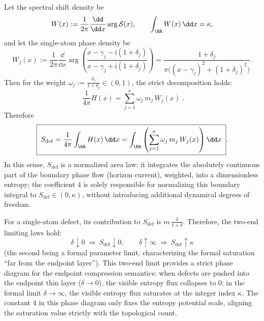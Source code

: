 \begin{proposition}\label{con:xi-sdef-as-weighted-spectral-shift-area}
Let the spectral shift density be
\[
W(x):=\frac{1}{2\pi}\frac{\dd}{\dd x}\arg \mathcal{S}(x),
\qquad \int_{\RR}W(x)\,\dd x=\kappa,
\]
and let the single-atom phase density be
\[
W_j(x):=\frac{1}{2\pi}\frac{\dd}{\dd x}\arg\!\left(\frac{x-\gamma_j-\mathrm{i}(1+\delta_j)}{x-\gamma_j+\mathrm{i}(1+\delta_j)}\right)
=\frac{1+\delta_j}{\pi\bigl((x-\gamma_j)^2+(1+\delta_j)^2\bigr)}.
\]
Then for the weight \(\omega_j:=\frac{\delta_j}{1+\delta_j}\in(0,1)\), the strict decomposition holds:
\[
\boxed{\;
\frac{1}{4\pi}H(x)=\sum_{j=1}^{\kappa}\omega_j\,m_j\,W_j(x)\; }.
\]
Therefore
\[
\boxed{\;
S_{\mathrm{def}}
=\frac{1}{4\pi}\int_{\RR}H(x)\,\dd x
=\int_{\RR}\left(\sum_{j=1}^{\kappa}\omega_j\,m_j\,W_j(x)\right)\dd x\; }.
\]
In this sense, \(S_{\mathrm{def}}\) is a normalized area law: it integrates the absolutely continuous part of the boundary phase flow (horizon current), weighted, into a dimensionless entropy; the coefficient \(4\) is solely responsible for normalizing this boundary integral to \(S_{\mathrm{def}}\in(0,\kappa)\), without introducing additional dynamical degrees of freedom.
\end{proposition}

\begin{proposition}\label{con:xi-sdef-collapse-saturation-phase}
For a single-atom defect, its contribution to \(S_{\mathrm{def}}\) is \(m\,\frac{\delta}{1+\delta}\).
Therefore, the two-end limiting laws hold:
\[
\boxed{\;
\delta\downarrow 0\ \Longrightarrow\ S_{\mathrm{def}}\downarrow 0,
\qquad
\delta\uparrow\infty\ \Longrightarrow\ S_{\mathrm{def}}\uparrow \kappa\;}
\]
(the second being a formal parameter limit, characterizing the formal saturation ``far from the endpoint layer'').
This two-end limit provides a strict phase diagram for the endpoint compression semantics: when defects are pushed into the endpoint thin layer (\(\delta\to 0\)), the visible entropy flux collapses to \(0\); in the formal limit \(\delta\to\infty\), the visible entropy flux saturates at the integer index \(\kappa\).
The constant \(4\) in this phase diagram only fixes the entropy potential scale, aligning the saturation value strictly with the topological count.
\end{proposition}

